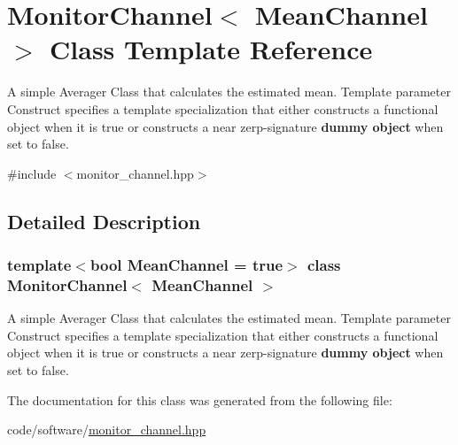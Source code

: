 \hypertarget{classMonitorChannel}{}\section{Monitor\+Channel$<$ Mean\+Channel $>$ Class Template Reference}
\label{classMonitorChannel}


A simple Averager Class that calculates the estimated mean. Template parameter {\ttfamily Construct} specifies a template specialization that either constructs a functional object when it is {\ttfamily true} or constructs a near zerp-\/signature {\bfseries dummy object} when set to {\ttfamily false}.  




{\ttfamily \#include $<$monitor\+\_\+channel.\+hpp$>$}



\subsection{Detailed Description}
\subsubsection*{template$<$bool Mean\+Channel = true$>$\newline
class Monitor\+Channel$<$ Mean\+Channel $>$}

A simple Averager Class that calculates the estimated mean. Template parameter {\ttfamily Construct} specifies a template specialization that either constructs a functional object when it is {\ttfamily true} or constructs a near zerp-\/signature {\bfseries dummy object} when set to {\ttfamily false}. 

The documentation for this class was generated from the following file\+:\begin{DoxyCompactItemize}
\item 
code/software/\hyperlink{monitor__channel_8hpp}{monitor\+\_\+channel.\+hpp}\end{DoxyCompactItemize}
